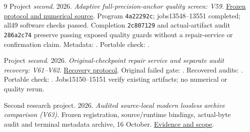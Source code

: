 \documentclass[10pt,twocolumn,letterpaper]{article}
\begin{document}
\begin{thebibliography}{9}
Project \emph{second}. 2026. \emph{Adaptive full-precision-anchor quality screen: V59}.
\href{https://github.com/priyankjairaj100/second/blob/60a514098511526924cb5746a2a61851b5f6bd23/research_v59/PROTOCOL.txt}{Frozen protocol and numerical source}.
Program \texttt{4a22292c}; jobs13548--13551 completed; all49 software checks passed.
Completion \texttt{2c807129} and actual-artifact audit \texttt{286a2c74} preserve
passing exposed quality guards without a repair-service or confirmation claim.
Metadata: .
Portable check: .

Project \emph{second}. 2026. \emph{Original-checkpoint repair service and separate
audit recovery: V61--V62}.
\href{https://github.com/priyankjairaj100/second/blob/codex/second-cluster-v42/research_v62/PROTOCOL.txt}{Recovery protocol}.
Original failed gate: .
Recovered audits: .
Portable check: .
Jobs15150--15151 verify existing artifacts; no numerical or quality rerun.


Second research project. 2026.
\emph{Audited source-local modern lossless archive comparison (V63).}
Frozen registration, source/runtime bindings, actual-byte audit and terminal
metadata archive, 16 October.
\href{https://github.com/priyankjairaj100/second/blob/codex/second-cluster-v42/docs/TERMINAL_EVIDENCE_V63.txt}{Evidence and scope}.

\end{thebibliography}
\end{document}
